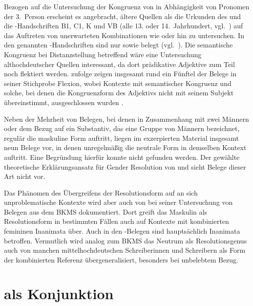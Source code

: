 Bezogen auf die Untersuchung der Kongruenz von  in Abhängigkeit von
Pro\-nomen der 3.~Person erscheint es angebracht, ältere Quellen als die
Urkunden des \CAO{} und die \KC{}-Handschriften B1, C1, K und VB (alle 13. oder
14.~Jahrhundert, vgl.~) auf das Auftreten von unerwarteten
Kombinationen wie  oder  hin zu untersuchen.
In den genannten \KC{}-Handschriften sind nur  sowie
 belegt (vgl.~). Die
semantische Kongruenz bei Distanz\-stellung betreffend wäre eine Untersuchung
althochdeutscher Quellen interessant, da dort prädikative
Adjektive zum Teil noch flektiert werden. \citet[310--311]{fleischer2007}
zufolge zeigen insgesamt rund ein Fünftel der Belege in seiner Stichprobe
Flexion, wobei Kontexte mit semantischer Kongruenz und solche, bei denen die
Kongruenzform des Adjektivs nicht mit seinem Subjekt übereinstimmt,
ausgeschlossen wurden \autocite[304]{fleischer2007}.

Neben der Mehrheit von Belegen, bei denen in Zusammenhang mit zwei Männern oder
dem Bezug auf ein Substantiv, das eine Gruppe von Männern bezeichnet, regulär
die maskuline Form  auftritt, liegen im exzerpierten Material
insgesamt neun Belege vor, in denen unregelmäßig die neutrale Form
 in demselben Kontext auftritt. Eine Begründung hierfür konnte
nicht gefunden werden. Der gewählte theoretische Erklärungsansatz für Gender
Resolution von \citet{wechslerzlatic2003} und \citet{wechsler2009} sieht Belege
dieser Art nicht vor.

Das Phänomen des Übergreifens der Resolutionsform auf an sich unproblematische
Kontexte wird aber auch von \citet[302]{corbett1991} bei seiner Untersuchung
von Belegen aus dem BKMS dokumentiert. Dort greift das Maskulin als
Resolutionsform in bestimmten Fällen auch auf Kon\-texte mit kombinierten
femininen Inanimata über. Auch in den \CAO{}-Belegen sind hauptsächlich
Inanimata betroffen. Vermutlich wird analog zum BKMS das Neutrum als
Resolutionsgenus auch von manchen mittelhochdeutschen
Schreiberinnen und Schreibern als Form der kombinierten Referenz
übergeneralisiert, besonders bei unbelebtem Bezug.


\section{ als Konjunktion}
\label{sec:beideconj}


